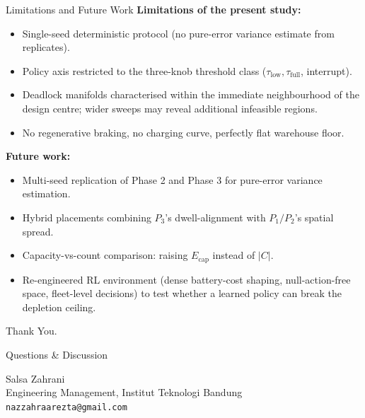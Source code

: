 \documentclass[aspectratio=169,10pt]{beamer}
\begin{document}
\begin{frame}{Limitations and Future Work}
  \footnotesize
  \textbf{Limitations of the present study:}
  \begin{itemize}
    \item Single-seed deterministic protocol (no pure-error variance estimate from replicates).
    \item Policy axis restricted to the three-knob threshold class ($\tau_\text{low}, \tau_\text{full}$, interrupt).
    \item Deadlock manifolds characterised within the immediate neighbourhood of the design centre; wider sweeps may reveal additional infeasible regions.
    \item No regenerative braking, no charging curve, perfectly flat warehouse floor.
  \end{itemize}

  \vspace{0.5em}
  \textbf{Future work:}
  \begin{itemize}
    \item Multi-seed replication of Phase 2 and Phase 3 for pure-error variance estimation.
    \item Hybrid placements combining $P_3$'s dwell-alignment with $P_1/P_2$'s spatial spread.
    \item Capacity-vs-count comparison: raising $E_\text{cap}$ instead of $|C|$.
    \item Re-engineered RL environment (dense battery-cost shaping, null-action-free space, fleet-level decisions) to test whether a learned policy can break the depletion ceiling.
  \end{itemize}
\end{frame}

\begin{frame}
  \begin{center}
    \vspace{1cm}
    {\Huge Thank You.}

    \vspace{1.2cm}
    {\Large Questions \& Discussion}

    \vspace{1cm}
    \footnotesize
    Salsa Zahrani \\
    Engineering Management, Institut Teknologi Bandung \\
    \texttt{nazzahraarezta@gmail.com}
  \end{center}
\end{frame}
\end{document}

